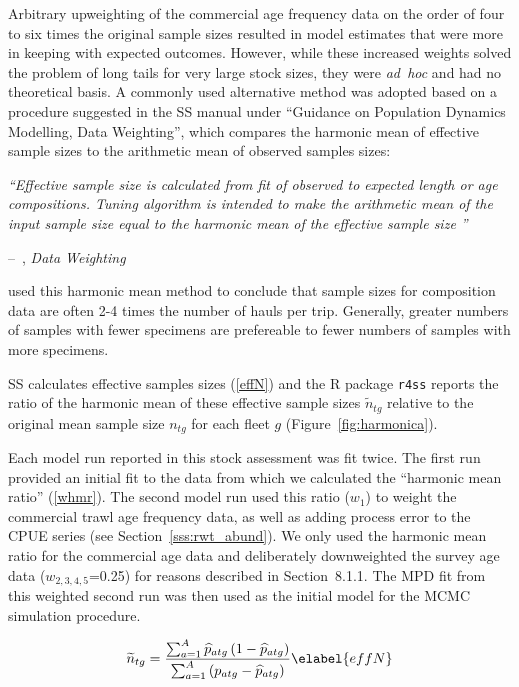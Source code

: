 \documentclass[11pt]{book}
\makeatletter
\newenvironment{chapquote}[2][2em]
  {\setlength{\@tempdima}{#1}%
   \def\chapquote@author{#2}%
   \parshape 1 \@tempdima \dimexpr\textwidth-2\@tempdima\relax%
   \itshape}
  {\par\normalfont\hfill--\ \chapquote@author\hspace*{\@tempdima}\par\smallskip}
\newcommand{\code}[1]{\normalsize\texttt{#1}\normalsize}%
\def\vsd{\vspace*{1ex}}     %
\newcommand{\eref}[1]{(\ref{#1})}
\renewcommand{\eb}{\vsd \vsd \begin{eqnarray}}
\renewcommand{\ee}{\end{eqnarray} \vsd }
\makeatother
\begin{document}
Arbitrary upweighting of the commercial age frequency data on the order of four to six times the original sample sizes resulted in model estimates that were more in keeping with expected outcomes.
However, while these increased weights solved the problem of long tails for very large stock sizes, they were \emph{ad~hoc} and had no theoretical basis.
A commonly used alternative method was adopted based on a procedure suggested in the SS manual under ``Guidance on Population Dynamics Modelling, Data Weighting'', which compares the harmonic mean of effective sample sizes to the arithmetic mean of observed samples sizes:

\begin{chapquote}{\citet{Methot-etal:2021}, \textit{Data Weighting}}
``Effective sample size is calculated from fit of observed to expected length or age compositions. Tuning algorithm is intended to make the arithmetic mean of the input sample size equal to the harmonic mean of the effective sample size \citep{McAllister-Ianelli:1997}''
\end{chapquote}

\citet{Stewart-Hamel:2014} used this harmonic mean method to conclude that sample sizes for composition data are often 2-4 times the number of hauls per trip.
Generally, greater numbers of samples with fewer specimens are prefereable to fewer numbers of samples with more specimens.

SS calculates effective samples sizes \eref{effN} and the R package \code{r4ss} \citep{R:2020_r4ss} reports the ratio of the harmonic mean of these effective sample sizes $\widetilde{n}_{tg}$ relative to the original mean sample size $n_{tg}$ for each fleet $g$ (Figure~\ref{fig:harmonica}).

Each model run reported in this stock assessment was fit twice.
The first run provided an initial fit to the data from which we calculated the ``harmonic mean ratio'' \eref{whmr}.
The second model run used this ratio ($w_1$) to weight the commercial trawl age frequency data, as well as adding process error to the CPUE series (see Section~\ref{sss:rwt_abund}).
We only used the harmonic mean ratio for the commercial age data and deliberately downweighted the survey age data ($w_{2,3,4,5}$=0.25) for reasons described in Section~8.1.1.
The MPD fit from this weighted second run was then used as the initial model for the MCMC simulation procedure.

\eb
\widetilde{n}_{tg} = \frac{ \sum_{a=1}^A \widehat{p}_{atg} \left( 1 - \widehat{p}_{atg} \right) } { \sum_{a=1}^A \left( p_{atg} - \widehat{p}_{atg} \right) } \elabel{effN}
\ee
\end{document}
